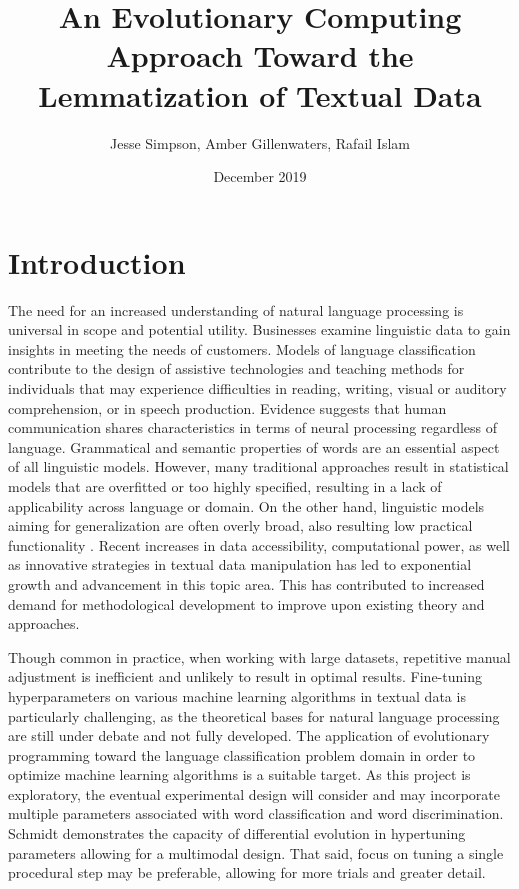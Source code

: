 \documentclass{article}
\title{An Evolutionary Computing Approach Toward the Lemmatization of Textual Data}
\author{Jesse Simpson, Amber Gillenwaters, Rafail Islam}
\date{December 2019}
\begin{document}
\maketitle

\section{Introduction}

The need for an increased understanding of natural language processing is universal in scope and potential utility. Businesses examine linguistic data to gain insights in meeting the needs of customers. Models of language classification contribute to the design of assistive technologies and teaching methods for individuals that may experience difficulties in reading, writing, visual or auditory comprehension, or in speech production. Evidence suggests that human communication shares characteristics in terms of neural processing regardless of language. Grammatical and semantic properties of words are an essential aspect of all linguistic models. However, many traditional approaches result in statistical models that are overfitted or too highly specified, resulting in a lack of applicability across language or domain. On the other hand, linguistic models aiming for generalization are often overly broad, also resulting low practical functionality \citep{nivre2015towards}. Recent increases in data accessibility, computational power, as well as innovative strategies in textual data manipulation has led to exponential growth and advancement in this topic area. This has contributed to increased demand for methodological development to improve upon existing theory and approaches. 

Though common in practice, when working with large datasets, repetitive manual adjustment is inefficient and unlikely to result in optimal results. Fine-tuning hyperparameters on various machine learning algorithms in textual data is particularly challenging, as the theoretical bases for natural language processing are still under debate and not fully developed. The application of evolutionary programming toward the language classification problem domain in order to optimize machine learning algorithms is a suitable target. As this project is exploratory, the eventual experimental design will consider and may incorporate multiple parameters associated with word classification and word discrimination. Schmidt \citep{schmidt2019performance} demonstrates the capacity of differential evolution in hypertuning parameters allowing for a multimodal design. That said, focus on tuning a single procedural step may be preferable, allowing for more trials and greater detail.
\end{document}
